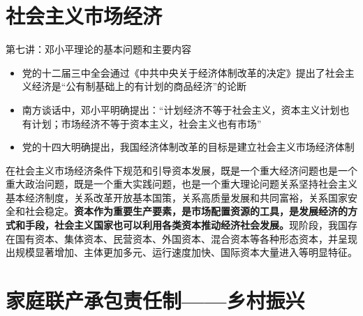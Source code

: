 \documentclass[
]{ctexart}
\providecommand{\tightlist}{%
  \setlength{\itemsep}{0pt}\setlength{\parskip}{0pt}}
\begin{document}
\hypertarget{ux793eux4f1aux4e3bux4e49ux5e02ux573aux7ecfux6d4e}{%
\section{社会主义市场经济}\label{ux793eux4f1aux4e3bux4e49ux5e02ux573aux7ecfux6d4e}}

第七讲：邓小平理论的基本问题和主要内容

\begin{itemize}
\tightlist
\item
  党的十二届三中全会通过《中共中央关于经济体制改革的决定》提出了社会主义经济是``公有制基础上的有计划的商品经济''的论断
\item
  南方谈话中，邓小平明确提出：``计划经济不等于社会主义，资本主义计划也有计划；市场经济不等于资本主义，社会主义也有市场''
\item
  党的十四大明确提出，我国经济体制改革的目标是建立社会主义市场经济体制
\end{itemize}

在社会主义市场经济条件下规范和引导资本发展，既是一个重大经济问题也是一个重大政治问题，既是一个重大实践问题，也是一个重大理论问题关系坚持社会主义基本经济制度，关系改革开放基本国策，关系高质量发展和共同富裕，关系国家安全和社会稳定。\textbf{资本作为重要生产要素，是市场配置资源的工具，是发展经济的方式和手段，社会主义国家也可以利用各类资本推动经济社会发展。}现阶段，我国存在国有资本、集体资本、民营资本、外国资本、混合资本等各种形态资本，并呈现出规模显著增加、主体更加多元、运行速度加快、国际资本大量进入等明显特征。

\hypertarget{ux5bb6ux5eadux8054ux4ea7ux627fux5305ux8d23ux4efbux5236ux4e61ux6751ux632fux5174}{%
\section{家庭联产承包责任制------乡村振兴}\label{ux5bb6ux5eadux8054ux4ea7ux627fux5305ux8d23ux4efbux5236ux4e61ux6751ux632fux5174}}
\end{document}
